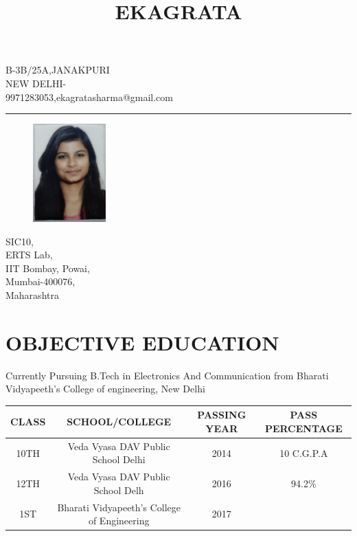 \documentclass{article}
\date{}
\begin{document}
\title{EKAGRATA}
\maketitle
\vspace{-2cm}


\begin{center}

{\large B-3B/25A,JANAKPURI\\
NEW DELHI-\\
9971283053,ekagratasharma@gmail.com\\} 
\end{center}
\noindent\rule{15cm}{1pt}

\begin{figure}
    \centering
    \includegraphics[width=0.25\textwidth]{photo.jpg}
\end{figure}

SIC10,\\
ERTS Lab,\\
IIT Bombay, Powai,\\
Mumbai-400076,\\
Maharashtra

\vspace{1cm}

\section{OBJECTIVE EDUCATION}
\large Currently Pursuing B.Tech in Electronics And Communication from Bharati Vidyapeeth's College of engineering, New Delhi
\begin{center}
\begin{tabular}{ |c|c|c|c|} 
 \hline
 CLASS &SCHOOL/COLLEGE  & PASSING YEAR & PASS PERCENTAGE \\ 
\hline
 10TH & Veda Vyasa DAV Public School Delhi & 2014 & 10 C.G.P.A \\ 
 12TH & Veda Vyasa DAV Public School Delh& 2016 & 94.2\% \\ 
 1ST   & Bharati Vidyapeeth's College of Engineering& 2017& \\
 \hline
\end{tabular}
\end{center}
\end{document}
